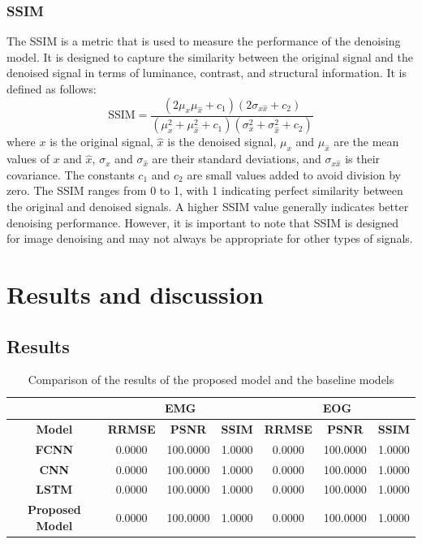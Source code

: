 \documentclass[a4paper]{sapthesis}
\begin{document}
\subsubsection{SSIM}
The SSIM is a metric that is used to measure the performance of the
denoising model. It is designed to capture the similarity between the 
original signal and the denoised signal in terms of luminance, 
contrast, and structural information. It is defined as follows:
\begin{equation}
\text{SSIM} = \frac{(2\mu_x\mu_{\hat{x}} + c_1)(2\sigma_{x {\hat{x}}} + c_2)}{(\mu_x^2 + \mu_{\hat{x}}^2 + c_1)(\sigma_x^2 + \sigma_{\hat{x}}^2 + c_2)}
\end{equation}
where $x$ is the original signal, $\hat{x}$ is the denoised signal, 
$\mu_x$ and $\mu_{\hat{x}}$ are the mean values of $x$ and $\hat{x}$, 
$\sigma_x$ and $\sigma_{\hat{x}}$ are their standard deviations, and 
$\sigma_{x\hat{x}}$ is their covariance. The constants $c_1$ and $c_2$ 
are small values added to avoid division by zero.\newline
The SSIM ranges from 0 to 1, with 1 indicating perfect similarity between 
the original and denoised signals. A higher SSIM value generally indicates 
better denoising performance. However, it is important to note that SSIM 
is designed for image denoising and may not always be appropriate for 
other types of signals.

\section{Results and discussion}
\subsection{Results}
\begin{table}[h!]
\centering
\caption{Comparison of the results of the proposed model and the baseline models}
\label{tab:rrmse}
\begin{tabular}{|c|c|c|c|c|c|c|}
\hline
\multicolumn{1}{|c|}{} & \multicolumn{3}{c|}{\textbf{EMG}} & \multicolumn{3}{c|}{\textbf{EOG}} \\ \cline{2-7}
\hline
\textbf{Model} & \textbf{RRMSE} & \textbf{PSNR} & \textbf{SSIM} & \textbf{RRMSE} & \textbf{PSNR} & \textbf{SSIM} \\ 
\hline
\textbf{FCNN} & 0.0000 & 100.0000 & 1.0000 & 0.0000 & 100.0000 & 1.0000 \\
\hline
\textbf{CNN} & 0.0000 & 100.0000 & 1.0000 & 0.0000 & 100.0000 & 1.0000 \\ 
\hline
\textbf{LSTM} & 0.0000 & 100.0000 & 1.0000 & 0.0000 & 100.0000 & 1.0000 \\ 
\hline
\textbf{Proposed Model} & 0.0000 & 100.0000 & 1.0000 & 0.0000 & 100.0000 & 1.0000 \\
\hline
\end{tabular}
\end{table}
\end{document}
